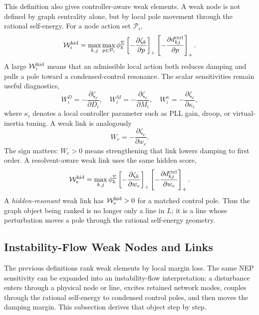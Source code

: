 \documentclass[journal]{IEEEtran}
\begin{document}
This definition also gives controller-aware weak elements. A weak node is not defined by graph centrality alone, but by local pole movement through the rational self-energy. For a node action set $\mathcal{P}_i$,
\begin{equation}
\mathcal{W}_i^{\rm hid}
=
\max_{k,j}\max_{p\in\mathcal{P}_i}
\phi_k^\Sigma
\left[-\frac{\partial\zeta_k}{\partial p}\right]_+
\left[-\frac{\partial d_{kj}^{\rm ctrl}}{\partial p}\right]_+ .
\label{eq:resolventweaknode}
\end{equation}
A large $\mathcal{W}_i^{\rm hid}$ means that an admissible local action both reduces damping and pulls a pole toward a condensed-control resonance. The scalar sensitivities remain useful diagnostics,
\begin{equation}
W_i^{D}=-\frac{\partial\zeta_c}{\partial D_i},\quad
W_i^{M}=-\frac{\partial\zeta_c}{\partial M_i},\quad
W_i^{\kappa}=-\frac{\partial\zeta_c}{\partial \kappa_i},
\label{eq:weaknode}
\end{equation}
where $\kappa_i$ denotes a local controller parameter such as PLL gain, droop, or virtual-inertia tuning. A weak link is analogously
\begin{equation}
W_e=-\frac{\partial\zeta_c}{\partial w_e}.
\label{eq:weaklink}
\end{equation}
The sign matters: $W_e>0$ means strengthening that link lowers damping to first order. A resolvent-aware weak link uses the same hidden score,
\begin{equation}
\mathcal{W}_e^{\rm hid}
=
\max_{k,j}
\phi_k^\Sigma
\left[-\frac{\partial\zeta_k}{\partial w_e}\right]_+
\left[-\frac{\partial d_{kj}^{\rm ctrl}}{\partial w_e}\right]_+ .
\label{eq:resolventweaklink}
\end{equation}
A \emph{hidden-resonant} weak link has $\mathcal{W}_e^{\rm hid}>0$ for a matched control pole. Thus the graph object being ranked is no longer only a line in $L$; it is a line whose perturbation moves a pole through the rational self-energy geometry.

\subsection{Instability-Flow Weak Nodes and Links}

The previous definitions rank weak elements by local margin loss. The same NEP sensitivity can be expanded into an instability-flow interpretation: a disturbance enters through a physical node or line, excites retained network modes, couples through the rational self-energy to condensed control poles, and then moves the damping margin. This subsection derives that object step by step.
\end{document}
